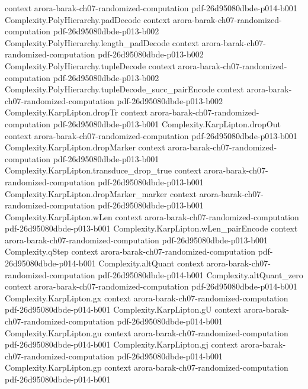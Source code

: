 \begin{theorem}
  {context}
  {arora-barak-ch07-randomized-computation}
  {pdf-26d95080dbde-p014-b001}
\proofstep
  {Complexity.PolyHierarchy.padDecode}
  {context}
  {arora-barak-ch07-randomized-computation}
  {pdf-26d95080dbde-p013-b002}
\proofstep
  {Complexity.PolyHierarchy.length_padDecode}
  {context}
  {arora-barak-ch07-randomized-computation}
  {pdf-26d95080dbde-p013-b002}
\proofstep
  {Complexity.PolyHierarchy.tupleDecode}
  {context}
  {arora-barak-ch07-randomized-computation}
  {pdf-26d95080dbde-p013-b002}
\proofstep
  {Complexity.PolyHierarchy.tupleDecode_succ_pairEncode}
  {context}
  {arora-barak-ch07-randomized-computation}
  {pdf-26d95080dbde-p013-b002}
\proofstep
  {Complexity.KarpLipton.dropTr}
  {context}
  {arora-barak-ch07-randomized-computation}
  {pdf-26d95080dbde-p013-b001}
\proofstep
  {Complexity.KarpLipton.dropOut}
  {context}
  {arora-barak-ch07-randomized-computation}
  {pdf-26d95080dbde-p013-b001}
\proofstep
  {Complexity.KarpLipton.dropMarker}
  {context}
  {arora-barak-ch07-randomized-computation}
  {pdf-26d95080dbde-p013-b001}
\proofstep
  {Complexity.KarpLipton.transduce_drop_true}
  {context}
  {arora-barak-ch07-randomized-computation}
  {pdf-26d95080dbde-p013-b001}
\proofstep
  {Complexity.KarpLipton.dropMarker_marker}
  {context}
  {arora-barak-ch07-randomized-computation}
  {pdf-26d95080dbde-p013-b001}
\proofstep
  {Complexity.KarpLipton.wLen}
  {context}
  {arora-barak-ch07-randomized-computation}
  {pdf-26d95080dbde-p013-b001}
\proofstep
  {Complexity.KarpLipton.wLen_pairEncode}
  {context}
  {arora-barak-ch07-randomized-computation}
  {pdf-26d95080dbde-p013-b001}
\proofstep
  {Complexity.qStep}
  {context}
  {arora-barak-ch07-randomized-computation}
  {pdf-26d95080dbde-p014-b001}
\proofstep
  {Complexity.altQuant}
  {context}
  {arora-barak-ch07-randomized-computation}
  {pdf-26d95080dbde-p014-b001}
\proofstep
  {Complexity.altQuant_zero}
  {context}
  {arora-barak-ch07-randomized-computation}
  {pdf-26d95080dbde-p014-b001}
\proofstep
  {Complexity.KarpLipton.gx}
  {context}
  {arora-barak-ch07-randomized-computation}
  {pdf-26d95080dbde-p014-b001}
\proofstep
  {Complexity.KarpLipton.gU}
  {context}
  {arora-barak-ch07-randomized-computation}
  {pdf-26d95080dbde-p014-b001}
\proofstep
  {Complexity.KarpLipton.gu}
  {context}
  {arora-barak-ch07-randomized-computation}
  {pdf-26d95080dbde-p014-b001}
\proofstep
  {Complexity.KarpLipton.gj}
  {context}
  {arora-barak-ch07-randomized-computation}
  {pdf-26d95080dbde-p014-b001}
\proofstep
  {Complexity.KarpLipton.gp}
  {context}
  {arora-barak-ch07-randomized-computation}
  {pdf-26d95080dbde-p014-b001}

\end{theorem}
